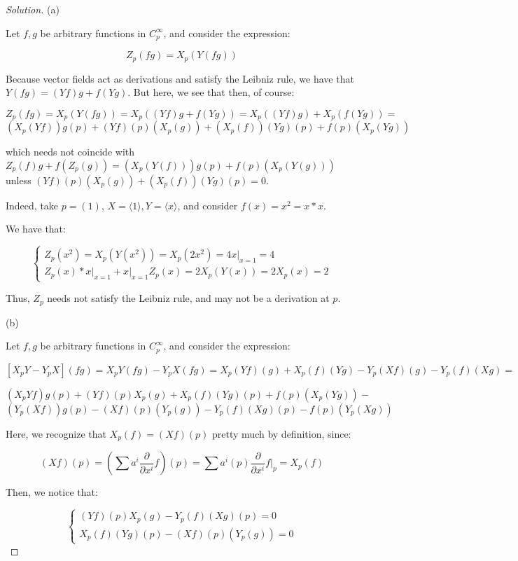 \documentclass[10pt]{article}
\begin{document}
\begin{proof}[Solution]

(a)

Let $f,g$ be arbitrary functions in $C_p^\infty$, and consider the expression:

$$ Z_p(fg) = X_p(Y(fg)) $$

Because vector fields act as derivations and satisfy the Leibniz rule, we have that $Y(fg)= (Yf)g + f(Yg)$. But here, we see that then, of course:

$$ Z_p(fg) = X_p(Y(fg)) = X_p((Yf)g + f(Yg)) = X_p((Yf)g) + X_p (f(Yg)) = $$
$$ (X_p(Yf))g(p) + (Yf)(p)(X_p(g)) + (X_p(f))(Yg)(p) + f(p)(X_p(Yg))$$

which needs not coincide with $Z_p(f)g + f(Z_p(g)) =  (X_p(Y(f)))g(p) + f(p)(X_p(Y(g)))$ unless $ (Yf)(p)(X_p(g)) + (X_p(f))(Yg)(p)  = 0$. 

Indeed, take $p = (1)$, $X = \langle 1 \rangle, Y = \langle x \rangle$, and consider $ f(x) = x^2 = x * x$.

We have that:

$$\begin{cases} Z_p(x^2) = X_p(Y(x^2)) = X_p (2x^2) = 4x \Big\rvert_{x=1} = 4 \\ Z_p(x) * x  \Big\rvert_{x=1} + x  \Big\rvert_{x=1} Z_p(x) =2 X_p(Y(x)) = 2 X_p(x) = 2  \end{cases}$$

Thus, $Z_p$ needs not satisfy the Leibniz rule, and may not be a derivation at $p$.

(b)

Let $f,g$ be arbitrary functions in $C_p^\infty$, and consider the expression:

 $$[X_pY  - Y_pX](fg) = X_pY(fg) - Y_pX(fg) = X_p(Yf)(g) +  X_p (f)(Yg) - Y_p(Xf)(g) - Y_p(f)(Xg) = $$

$$ (X_pYf)g(p) + (Yf)(p) X_p(g) + X_p(f) (Yg)(p) + f(p) (X_p(Yg)) - $$
$$(Y_p(Xf))g(p) -  (Xf)(p)(Y_p(g)) - Y_p(f) (Xg)(p) - f(p) (Y_p(Xg)) $$

Here, we recognize that $X_p(f) = (Xf)(p)$ pretty much by definition, since:

$$(Xf)(p) = \left(\sum a^i \frac{\partial}{\partial x^i} f\right)(p) = \sum a^i(p) \frac{\partial}{\partial x^i} f  \Big\rvert_{p} = X_p(f)$$

Then, we notice that:

$$\begin{cases} (Yf)(p) X_p(g) - Y_p(f) (Xg)(p) = 0 \\  X_p(f) (Yg)(p) -  (Xf)(p)(Y_p(g)) = 0 \end{cases}$$


\end{proof}
\end{document}
